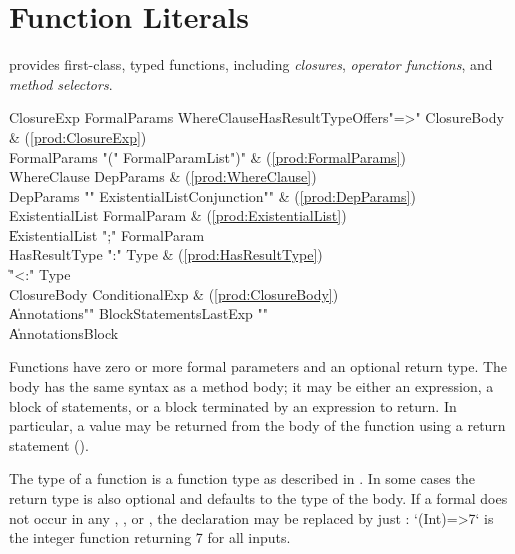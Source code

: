 \section{Function Literals}
\label{FunctionLiteral}

\Xten{} provides first-class, typed functions, including
\emph{closures}, \emph{operator functions}, and \emph{method
  selectors}.

\begin{bbgrammar}
 ClosureExp    \: FormalParams WhereClause\opt HasResultType\opt Offers\opt \xcd"=>" ClosureBody & (\ref{prod:ClosureExp})\\%
 FormalParams    \: \xcd"(" FormalParamList\opt \xcd")" & (\ref{prod:FormalParams})\\%
 WhereClause    \: DepParams & (\ref{prod:WhereClause})\\%
 DepParams    \: \xcd"{" ExistentialList\opt Conjunction\opt \xcd"}" & (\ref{prod:DepParams})\\%
 ExistentialList    \: FormalParam & (\ref{prod:ExistentialList})\\%
    \| ExistentialList \xcd";" FormalParam\\
 HasResultType    \: \xcd":" Type & (\ref{prod:HasResultType})\\%
    \| \xcd"<:" Type\\
 ClosureBody    \: ConditionalExp & (\ref{prod:ClosureBody})\\%
    \| Annotations\opt \xcd"{" BlockStatements\opt LastExp \xcd"}"\\
    \| Annotations\opt Block\\
\end{bbgrammar}


Functions have zero or more formal parameters and an optional return type.
The body has the 
same syntax as a method body; it may be either an expression, a block
of statements, or a block terminated by an expression to return. In
particular, a value may be returned from the body of the function
using a return statement (). 

The type of a function is a function type as described in .  In some
cases the 
return type  is also optional and defaults to the type of the
body. If a formal  does not occur in any
, ,  or , the declaration  may
be replaced by just : \xcd`(Int)=>7` is the integer function returning
7 for all inputs.

